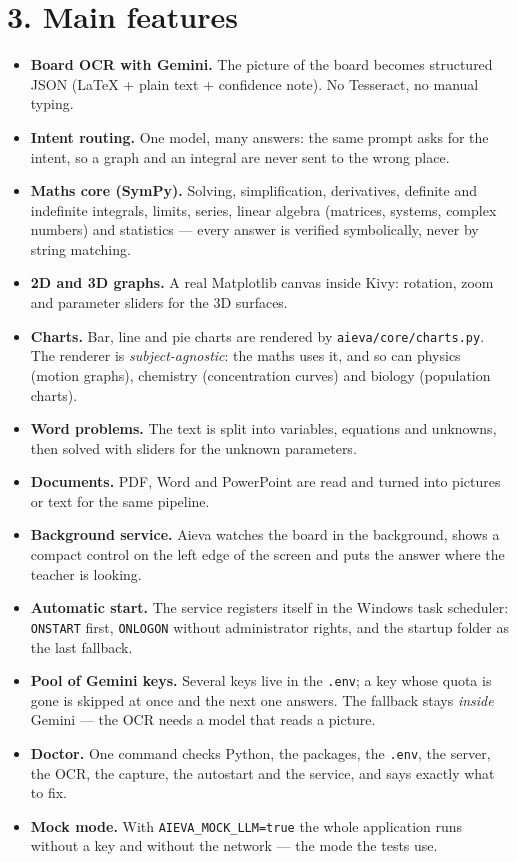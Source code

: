 \documentclass[10pt,a4paper]{article}
\begin{document}
\section*{3. Main features}

\begin{itemize}
\item \textbf{Board OCR with Gemini.} The picture of the board becomes
      structured JSON (LaTeX + plain text + confidence note). No Tesseract, no
      manual typing.
\item \textbf{Intent routing.} One model, many answers: the same prompt asks
      for the intent, so a graph and an integral are never sent to the wrong
      place.
\item \textbf{Maths core (SymPy).} Solving, simplification, derivatives,
      definite and indefinite integrals, limits, series, linear algebra
      (matrices, systems, complex numbers) and statistics --- every answer is
      verified symbolically, never by string matching.
\item \textbf{2D and 3D graphs.} A real Matplotlib canvas inside Kivy:
      rotation, zoom and parameter sliders for the 3D surfaces.
\item \textbf{Charts.} Bar, line and pie charts are rendered by
      \texttt{aieva/core/charts.py}. The renderer is \emph{subject-agnostic}:
      the maths uses it, and so can physics (motion graphs), chemistry
      (concentration curves) and biology (population charts).
\item \textbf{Word problems.} The text is split into variables, equations and
      unknowns, then solved with sliders for the unknown parameters.
\item \textbf{Documents.} PDF, Word and PowerPoint are read and turned into
      pictures or text for the same pipeline.
\item \textbf{Background service.} Aieva watches the board in the background,
      shows a compact control on the left edge of the screen and puts the
      answer where the teacher is looking.
\item \textbf{Automatic start.} The service registers itself in the Windows
      task scheduler: \texttt{ONSTART} first, \texttt{ONLOGON} without
      administrator rights, and the startup folder as the last fallback.
\item \textbf{Pool of Gemini keys.} Several keys live in the \texttt{.env};
      a key whose quota is gone is skipped at once and the next one answers.
      The fallback stays \emph{inside} Gemini --- the OCR needs a model that
      reads a picture.
\item \textbf{Doctor.} One command checks Python, the packages, the
      \texttt{.env}, the server, the OCR, the capture, the autostart and the
      service, and says exactly what to fix.
\item \textbf{Mock mode.} With \texttt{AIEVA\_MOCK\_LLM=true} the whole
      application runs without a key and without the network --- the mode the
      tests use.
\end{itemize}
\end{document}
